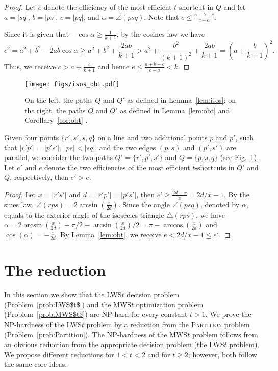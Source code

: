 \documentclass[a4paper]{llncs}
\begin{document}
\begin{proof}
Let $e$ denote the efficiency of the most efficient $t$-shortcut in $Q$ and let $a=|sq|$, $b=|ps|$, $c=|pq|$, and $\alpha=\angle(psq)$.
Note that $e \leq \frac{a+b-c}{c-a}$.

Since it is given that $-\cos\alpha \geq \frac{1}{k+1}$,
by the cosines law we have
$$c^2 = a^2+b^2-2ab\cos\alpha \geq a^2+b^2+\frac{2ab}{k+1} > a^2+\frac{b^2}{(k+1)^2}+\frac{2ab}{k+1}= (a+\frac{b}{k+1})^2.$$
Thus, we receive $c > a+\frac{b}{k+1}$  
and hence $e \leq\frac{a+b-c}{c-a} < k$.

\end{proof}
\begin{figure}[htb]
    \centering
        \texttt{[image: figs/isos\_obt.pdf]}
    \caption{On the left, the paths $Q$ and $Q'$ as defined in Lemma~\ref{lem:isos};
    on the right, the paths $Q$ and $Q'$ as defined in Lemma~\ref{lem:obt} and Corollary~\ref{cor:obt} .}
    \label{fig:isos_obt}
\end{figure}




\begin{corollary}\label{cor:obt}
Given four points $\{r',s',s,q\}$ on a line and two additional points $p$ and $p'$,
such that $|r'p'|=|p's'|$, $|ps|<|sq|$, and the two edges $(p,s)$ and $(p',s')$ are parallel,
we consider the two paths $Q'=\{r',p',s'\}$ and $Q=\{p,s,q\}$ (see Fig.~\ref{fig:isos_obt}). 
Let $e'$ and $e$ denote the two efficiencies of the most efficient $t$-shortcuts in $Q'$ and $Q$, respectively, then $e'>e$.
\end{corollary}

\begin{proof}
Let $x=|r's'|$ and $d=|r'p'|=|p's'|$, then $e' \geq \frac{2d-x}{x}=2d/x-1$.
By the sines law, $\angle(rps)=2\arcsin(\frac{x}{2d})$.
Since the angle $\angle(psq)$, denoted by $\alpha$, equals to the 
exterior angle of the isosceles triangle $\triangle(rps)$, we have
$\alpha = 2\arcsin(\frac{x}{2d})+\pi/2-\arcsin(\frac{x}{2d})/2=\pi-\arccos(\frac{x}{2d})$ and $\cos(\alpha) = -\frac{x}{2d}$.
By Lemma~\ref{lem:obt}, we receive $e<2d/x-1 \leq e'$.
\end{proof}




\section{The reduction}\label{sec:red}

In this section we show that the LWS$t$ decision problem (Problem~\ref{prob:LWS$t$})
and the MWS$t$ optimization problem (Problem~\ref{prob:MWS$t$}) 
are NP-hard for every constant $t>1$.
We prove the NP-hardness of the LWS$t$ problem by a reduction 
from the \textsc{Partition} problem (Problem~\ref{prob:Partition}).
The NP-hardness of the MWS$t$ problem 
follows from an obvious reduction from the appropriate 
decision problem (the LWS$t$ problem).
We propose different reductions for $1<t<2$ and for $t \geq 2$;
however, both follow the same core ideas.
\end{document}
